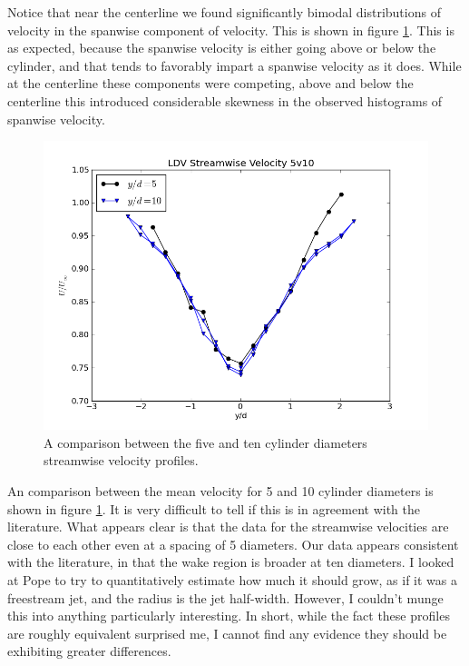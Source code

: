 \documentclass{article}
\begin{document}
Notice that near the centerline we found significantly bimodal
distributions of velocity in the spanwise component of velocity. This is
shown in figure \ref{back}. This is as expected, because the spanwise
velocity is either going above or below the cylinder, and that tends to
favorably impart a spanwise velocity as it does. While at the centerline
these components were competing, above and below the centerline this
introduced considerable skewness in the observed histograms of spanwise
velocity. 

\begin{figure}[!htb]
 \begin{center}
  \includegraphics[width = 12 cm]{figs/defect10}
  \caption{A comparison between the five and ten cylinder diameters
  streamwise velocity profiles.}
  \label{back}
 \end{center}
\end{figure}

An comparison between the mean velocity for 5 and 10 cylinder diameters
is shown in figure \ref{back}. It is very difficult to tell if this
is in agreement with the literature. What appears clear is that the data
for the streamwise velocities are close to each other even at a spacing
of 5 diameters. Our data appears consistent with the literature, in that
the wake region is broader at ten diameters. I looked at Pope to try to
quantitatively estimate how much it should grow, as if it was a
freestream jet, and the radius is the jet half-width. However, I
couldn't munge this into anything particularly interesting. In short,
while the fact these profiles are roughly equivalent surprised me, I
cannot find any evidence they should be exhibiting greater differences. 
\end{document}
